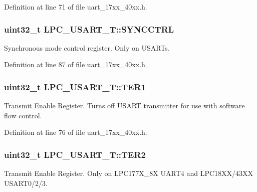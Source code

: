 Definition at line 71 of file uart\+\_\+17xx\+\_\+40xx.\+h.

\subsubsection[{\texorpdfstring{S\+Y\+N\+C\+C\+T\+RL}{SYNCCTRL}}]{ uint32\+\_\+t L\+P\+C\+\_\+\+U\+S\+A\+R\+T\+\_\+\+T\+::\+S\+Y\+N\+C\+C\+T\+RL}\hypertarget{structLPC__USART__T_a799433e27ab7a1b61ba215ff1766a3e0}{}\label{structLPC__USART__T_a799433e27ab7a1b61ba215ff1766a3e0}
Synchronous mode control register. Only on U\+S\+A\+R\+Ts. 

Definition at line 87 of file uart\+\_\+17xx\+\_\+40xx.\+h.

\subsubsection[{\texorpdfstring{T\+E\+R1}{TER1}}]{ uint32\+\_\+t L\+P\+C\+\_\+\+U\+S\+A\+R\+T\+\_\+\+T\+::\+T\+E\+R1}\hypertarget{structLPC__USART__T_afa3989925f4b5c3edd74531748ccccb2}{}\label{structLPC__USART__T_afa3989925f4b5c3edd74531748ccccb2}
Transmit Enable Register. Turns off U\+S\+A\+RT transmitter for use with software flow control. 

Definition at line 76 of file uart\+\_\+17xx\+\_\+40xx.\+h.

\subsubsection[{\texorpdfstring{T\+E\+R2}{TER2}}]{ uint32\+\_\+t L\+P\+C\+\_\+\+U\+S\+A\+R\+T\+\_\+\+T\+::\+T\+E\+R2}\hypertarget{structLPC__USART__T_afc422e0333356dc62b23d404bfdbd1de}{}\label{structLPC__USART__T_afc422e0333356dc62b23d404bfdbd1de}
Transmit Enable Register. Only on L\+P\+C177\+X\+\_\+8X U\+A\+R\+T4 and L\+P\+C18\+X\+X/43\+XX U\+S\+A\+R\+T0/2/3. 

